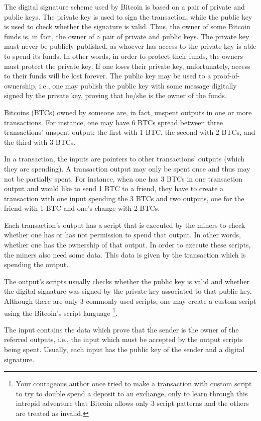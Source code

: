 The digital signature scheme used by Bitcoin is based on a pair of private and public keys. The private key is used to sign the transaction, while the public key is used to check whether the signature is valid. Thus, the owner of some Bitcoin funds is, in fact, the owner of a pair of private and public keys. The private key must never be publicly published, as whoever has access to the private key is able to spend its funds. In other words, in order to protect their funds, the owners must protect the private key. If one loses their private key, unfortunately, access to their funds will be lost forever. The public key may be used to a proof-of-ownership, i.e., one may publish the public key with some message digitally signed by the private key, proving that he/she is the owner of the funds.

Bitcoins (BTCs) owned by someone are, in fact, unspent outputs in one or more transactions. For instance, one may have 6 BTCs spread between three transactions' unspent output: the first with 1 BTC, the second with 2 BTCs, and the third with 3 BTCs.

In a transaction, the inputs are pointers to other transactions' outputs (which they are spending). A transaction output may only be spent once and thus may not be partially spent. For instance, when one has 3 BTCs in one transaction output and would like to send 1 BTC to a friend, they have to create a transaction with one input spending the 3 BTCs and two outputs, one for the friend with 1 BTC and one's change with 2 BTCs.

Each transaction's output has a script that is executed by the miners to check whether one has or has not permission to spend that output. In other words, whether one has the ownership of that output. In order to execute these scripts, the miners also need some data. This data is given by the transaction which is spending the output.

The output's scripts usually checks whether the public key is valid and whether the digital signature was signed by the private key associated to that public key. Although there are only 3 commonly used scripts, one may create a custom script using the Bitcoin's script language \footnote{Your courageous author once tried to make a transaction with custom script to try to double spend a deposit to an exchange, only to learn through this intrepid adventure that Bitcoin allows only 3 script patterns and the others are treated as invalid.}.

The input contains the data which prove that the sender is the owner of the referred outputs, i.e., the input which must be accepted by the output scripts being spent. Usually, each input has the public key of the sender and a digital signature.

